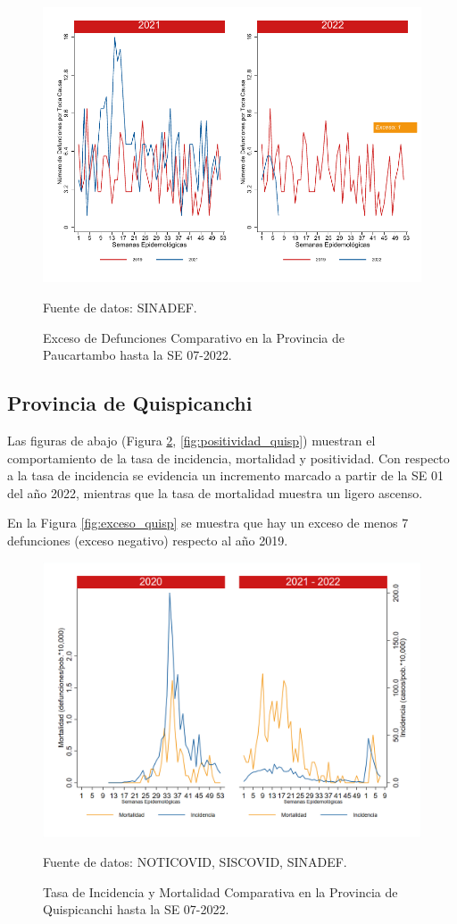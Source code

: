 \documentclass[12pt,a4paper,openany]{book}
\begin{document}
		\begin{figure}[h]
			\caption{Exceso de Defunciones Comparativo en la Provincia de Paucartambo hasta la SE 07-2022.}\label{fig:exceso_paucartam}
			\begin{center}
				\includegraphics[width=0.7\linewidth]{../figuras/exceso_11.pdf}
			\end{center}
			{\footnotesize {Fuente de datos: SINADEF.}}
		\end{figure}
		
		\clearpage
		
		\subsection*{Provincia de Quispicanchi}
		\noindent Las figuras de abajo (Figura \ref{fig:inc_mort_quisp}, \ref{fig:positividad_quisp}) muestran el comportamiento de la tasa de incidencia, mortalidad y positividad. Con respecto a la tasa de incidencia se evidencia un incremento marcado a partir de la SE 01 del año 2022, mientras que la tasa de mortalidad muestra un ligero ascenso.   

		
	En la Figura \ref{fig:exceso_quisp} se muestra que hay un exceso de menos 7 defunciones (exceso negativo) respecto al año 2019.
		
		\begin{figure}[h]
			\caption{Tasa de Incidencia y Mortalidad Comparativa en la Provincia de Quispicanchi hasta la SE 07-2022.}\label{fig:inc_mort_quisp}
			\begin{center}
				\includegraphics[width=0.7\linewidth]{../figuras/incidencia_mortalidad_20_21_12.png}
			\end{center}
			{\footnotesize {Fuente de datos: NOTICOVID, SISCOVID, SINADEF.}}
		\end{figure}
		
\end{document}
